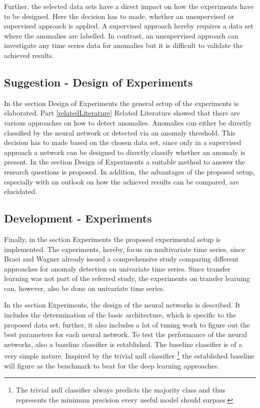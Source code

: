 Further, the selected data sets have a direct impact on how the experiments have to be designed. Here the decision has to made, whether an unsupervised or supervised approach is applied. A supervised approach hereby requires a data set where the anomalies are labelled. In contrast, an unsupervised approach can investigate any time series data for anomalies but it is difficult to validate the achieved results. 

\subsection{Suggestion - Design of Experiments}
In the section Design of Experiments the general setup of the experiments is elaborated. Part \ref{relatedLiterature} Related Literature showed that there are various approaches on how to detect anomalies. Anomalies can either be directly classified by the neural network or detected via an anomaly threshold. This decision has to made based on the chosen data set, since only in a supervised approach a network can be designed to directly classify whether an anomaly is present. In the section Design of Experiments a suitable method to answer the research questions is proposed. In addition, the advantages of the proposed setup, especially with an outlook on how the achieved results can be compared, are elucidated.   

\subsection{Development - Experiments}
Finally, in the section Experiments the proposed experimental setup is implemented. The experiments, hereby, focus on multivariate time series, since Braei and Wagner \parencite*{Braei2020} already issued a comprehensive study comparing different approaches for anomaly detection on univariate time series. Since transfer learning was not part of the referred study, the experiments on transfer learning can, however, also be done on univariate time series. 

In the section Experiments, the design of the neural networks is described. It includes the determination of the basic architecture, which is specific to the proposed data set, further, it also includes a lot of tuning work to figure out the best parameters for each neural network. To test the performance of the neural networks, also a baseline classifier is established. The baseline classifier is of a very simple nature. Inspired by the trivial null classifier \footnote{The trivial null classifier always predicts the majority class and thus represents the minimum precision every useful model should surpass.} the established baseline will figure as the benchmark to beat for the deep learning approaches. 

